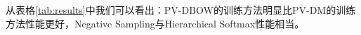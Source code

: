 \documentclass{article}
\begin{document}
从表格\ref{tab:results}中我们可以看出：PV-DBOW的训练方法明显比PV-DM的训练方法性能更好，Negative Sampling与Hierarchical Softmax性能相当。



\end{document}
